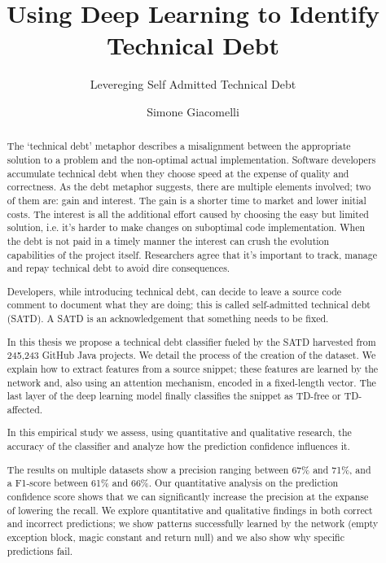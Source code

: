\documentclass[11pt, mscthesis]{usiinfthesis}
\title{Using Deep Learning to Identify Technical Debt} %
\subtitle{Levereging Self Admitted Technical Debt} %
\author{Simone Giacomelli} %
\begin{document}
\maketitle %

\frontmatter %

\begin{abstract}
The `technical debt' metaphor describes a misalignment between the appropriate solution to a problem and the non-optimal actual implementation. Software developers accumulate technical debt when they choose speed at the expense of quality and correctness. As the debt metaphor suggests, there are multiple elements involved; two of them are: gain and interest. The gain is a shorter time to market and lower initial costs. The interest is all the additional effort caused by choosing the easy but limited solution, i.e. it's harder to make changes on suboptimal code implementation. When the debt is not paid in a timely manner the interest can crush the evolution capabilities of the project itself. Researchers agree that it's important to track, manage and repay technical debt to avoid dire consequences.

Developers, while introducing technical debt, can decide to leave a source code comment to document what they are doing; this is called self-admitted technical debt (SATD). A SATD is an acknowledgement that something needs to be fixed.

In this thesis we propose a technical debt classifier fueled by the SATD harvested from 245,243 GitHub Java projects. We detail the process of the creation of the dataset. We explain how to extract features from a source snippet; these features are learned by the network and, also using an attention mechanism, encoded in a fixed-length vector. The last layer of the deep learning model finally classifies the snippet as TD-free or TD-affected.  

In this empirical study we assess, using quantitative and qualitative research, the accuracy of the classifier and analyze how the prediction confidence influences it.

The results on multiple datasets show a precision ranging between 67\% and 71\%, and a F1-score between 61\% and 66\%. Our quantitative analysis on the prediction confidence score shows that we can significantly increase the precision at the expanse of lowering the recall. 
We explore quantitative and qualitative findings in both correct and incorrect predictions; we show patterns successfully learned by the network (empty exception block, magic constant and return null) and we also show why specific predictions fail.



\end{abstract}
\end{document}
